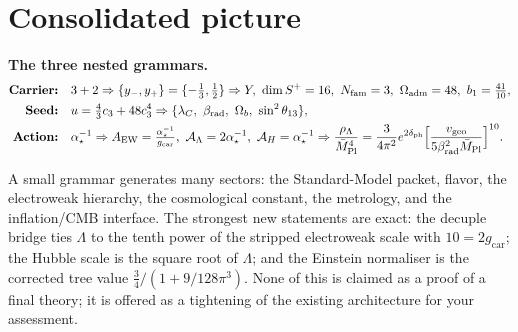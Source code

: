 \documentclass[11pt,a4paper]{article}
\newcommand{\Mbar}{\bar M_{\mathrm{Pl}}}
\newcommand{\gcar}{g_{\mathrm{car}}}
\newcommand{\Nfam}{N_{\mathrm{fam}}}
\newcommand{\Oadm}{\Omega_{\mathrm{adm}}}
\newcommand{\cthree}{c_3}
\newcommand{\useed}{u}
\newcommand{\dph}{\delta_{\mathrm{ph}}}
\newcommand{\betarad}{\beta_{\mathrm{rad}}}
\newcommand{\lC}{\lambda_C}
\newcommand{\ainv}{\alpha^{-1}_\star}
\newcommand{\AEW}{A_{\mathrm{EW}}}
\newcommand{\AL}{\mathcal A_\Lambda}
\newcommand{\AH}{\mathcal A_H}
\theoremstyle{definition}
\begin{document}
\section{Consolidated picture}

\par\medskip\noindent\textbf{The three nested grammars.}
\[
  \begin{aligned}
  \textbf{Carrier:}\quad & 3+2 \Rightarrow \{y_-,y_+\}=\{-\tfrac13,\tfrac12\}\Rightarrow Y,\ \dim S^+=16,\ \Nfam=3,\ \Oadm=48,\ b_1=\tfrac{41}{10},\\
  \textbf{Seed:}\quad & \useed=\tfrac43\cthree+48\cthree^4 \Rightarrow \{\lC,\ \betarad,\ \Omega_b,\ \sin^2\theta_{13}\},\\
  \textbf{Action:}\quad & \ainv \Rightarrow \AEW=\tfrac{\ainv}{\gcar},\ \AL=2\ainv,\ \AH=\ainv
  \Rightarrow \frac{\rho_\Lambda}{\Mbar^4}=\frac{3}{4\pi^2}e^{2\dph}\Bigl[\frac{v_{\mathrm{geo}}}{5\betarad^2\Mbar}\Bigr]^{10}.
  \end{aligned}
\]

\noindent A small grammar generates many sectors: the Standard-Model packet, flavor, the electroweak
hierarchy, the cosmological constant, the metrology, and the inflation/CMB interface. The strongest
new statements are exact: the decuple bridge ties $\Lambda$ to the tenth power of the stripped
electroweak scale with $10=2\gcar$; the Hubble scale is the square root of $\Lambda$; and the
Einstein normaliser is the corrected tree value $\tfrac34/(1+9/128\pi^3)$. None of this is claimed
as a proof of a final theory; it is offered as a tightening of the existing architecture for your
assessment.
\end{document}
